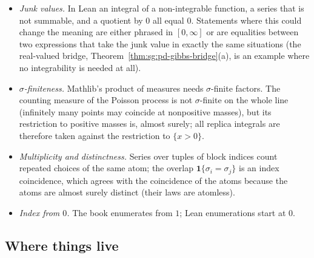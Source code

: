 \begin{itemize}
\item \emph{Junk values.} In Lean an integral of a non-integrable function, a series that is not summable, and a quotient by $0$ all equal $0$. Statements where this could change the meaning are either phrased in $[0,\infty]$ or are equalities between two expressions that take the junk value in exactly the same situations (the real-valued bridge, Theorem~\ref{thm:sg:pd-gibbs-bridge}(a), is an example where no integrability is needed at all).
\item \emph{$\sigma$-finiteness.} Mathlib's product of measures needs $\sigma$-finite factors. The counting measure of the Poisson process is not $\sigma$-finite on the whole line (infinitely many points may coincide at nonpositive masses), but its restriction to positive masses is, almost surely; all replica integrals are therefore taken against the restriction to $\{x>0\}$.
\item \emph{Multiplicity and distinctness.} Series over tuples of block indices count repeated choices of the same atom; the overlap $\mathbf 1\{\sigma_i=\sigma_j\}$ is an index coincidence, which agrees with the coincidence of the atoms because the atoms are almost surely distinct (their laws are atomless).
\item \emph{Index from $0$.} The book enumerates from $1$; Lean enumerations start at $0$.
\end{itemize}

\subsection*{Where things live}

